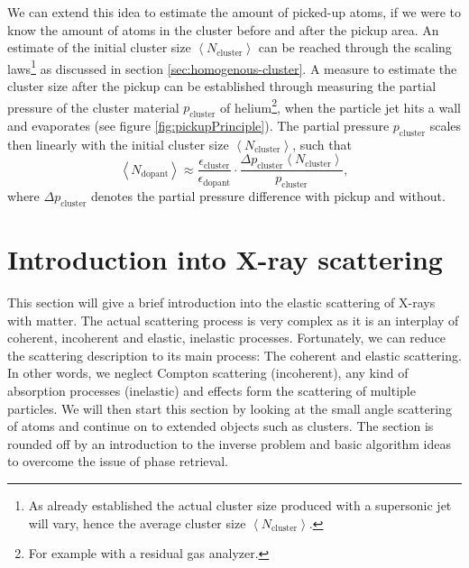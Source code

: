 We can extend this idea to estimate the amount of picked-up atoms, if we were to know the amount of atoms in the cluster before and after the pickup area. An estimate of the initial cluster size $\left\langle N_{\text{cluster}}\right\rangle$ can be reached through the scaling laws\footnote{As already established the actual cluster size produced with a supersonic jet will vary, hence the average cluster size $\left\langle N_{\text{cluster}}\right\rangle$.} as discussed in section \ref{sec:homogenous-cluster}. A measure to estimate the cluster size after the pickup can be established through measuring the partial pressure of the cluster material $p_{\text{cluster}}$ of helium\footnote{For example with a residual gas analyzer.}, when the particle jet hits a wall and evaporates (see figure \ref{fig:pickupPrinciple}). The partial pressure $p_{\text{cluster}}$ scales then linearly with the initial cluster size $\left\langle N_{\text{cluster}}\right\rangle$, such that
\begin{equation}
\left\langle N_{\text{dopant}}\right\rangle \approx \frac{\epsilon_{\text{cluster}}}{\epsilon_{\text{dopant}}} \cdot \frac{\Delta p_{\text{cluster}} \left\langle N_{\text{cluster}}\right\rangle}{p_{\text{cluster}}},
\label{eq:average-dopant}
\end{equation}
where $\Delta p_{\text{cluster}}$ denotes the partial pressure difference with pickup and without.
\section{Introduction into X-ray scattering}\label{sec:scattering-theory}
This section will give  a brief introduction into the elastic scattering of X-rays with matter. The actual scattering process is very complex as it is an interplay of coherent, incoherent and elastic, inelastic processes. Fortunately, we can reduce the scattering description to its main process: The coherent and elastic scattering. In other words, we neglect Compton scattering (incoherent), any kind of absorption processes (inelastic) and effects form the scattering of multiple particles. We will then start this section by looking at the small angle scattering of atoms and continue on to extended objects such as clusters. The section is rounded off by an introduction to the inverse problem and basic algorithm ideas to overcome the issue of phase retrieval.
